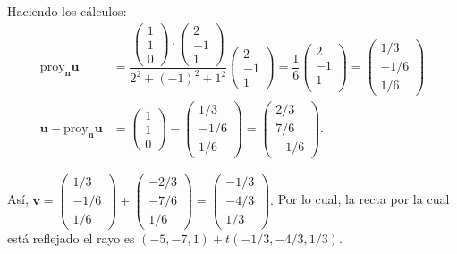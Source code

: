 \begin{example}
\begin{myproof}
Haciendo los cálculos: 
\begin{align*}
\text{proy}_{\mathbf{n}}\mathbf{u}&=\dfrac{\begin{pmatrix}
1\\1\\0
\end{pmatrix}\cdot \begin{pmatrix}
2\\-1\\1
\end{pmatrix}}{2^2+(-1)^2+1^2}\begin{pmatrix}
2\\-1\\1
\end{pmatrix}
=\dfrac{1}{6}\begin{pmatrix}2\\-1\\1\\\end{pmatrix}=\begin{pmatrix}1/3\\-1/6\\1/6 \end{pmatrix}\\
\mathbf{u}-\text{proy}_{\mathbf{n}}\mathbf{u}&=\begin{pmatrix}
1\\1\\0
\end{pmatrix}-\begin{pmatrix}
1/3\\-1/6\\1/6
\end{pmatrix}=\begin{pmatrix}
2/3\\7/6\\-1/6
\end{pmatrix}.
\end{align*}

Así, $\mathbf{v}=\begin{pmatrix} 1/3\\-1/6\\1/6 \end{pmatrix} + \begin{pmatrix}
-2/3\\-7/6\\1/6
\end{pmatrix}=\begin{pmatrix} -1/3\\-4/3\\1/3 \end{pmatrix}.$
Por lo cual, la recta por la cual está reflejado el rayo es $\boxed{(-5,-7,1)+t(-1/3,-4/3,1/3).}$
\end{myproof}
\end{example}

